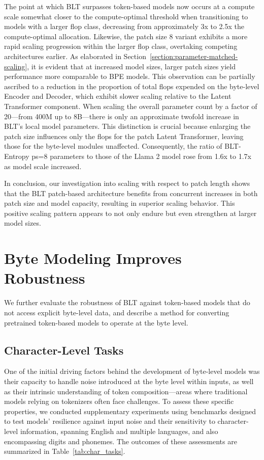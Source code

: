 The point at which {\textsc BLT} surpasses token-based models now occurs at a compute scale somewhat closer to the compute-optimal threshold when transitioning to models with a larger flop class, decreasing from approximately 3x to 2.5x the compute-optimal allocation. Likewise, the patch size 8 variant exhibits a more rapid scaling progression within the larger flop class, overtaking competing architectures earlier. As elaborated in Section~\ref{section:parameter-matched-scaling}, it is evident that at increased model sizes, larger patch sizes yield performance more comparable to BPE models. This observation can be partially ascribed to a reduction in the proportion of total flops expended on the byte-level Encoder and Decoder, which exhibit slower scaling relative to the Latent Transformer component. When scaling the overall parameter count by a factor of 20—from 400M up to 8B—there is only an approximate twofold increase in {\textsc BLT}'s local model parameters. This distinction is crucial because enlarging the patch size influences only the flops for the patch Latent Transformer, leaving those for the byte-level modules unaffected. Consequently, the ratio of {\textsc BLT}-Entropy ps=8 parameters to those of the Llama 2 model rose from 1.6x to 1.7x as model scale increased.

In conclusion, our investigation into scaling with respect to patch length shows that the {\textsc BLT} patch-based architecture benefits from concurrent increases in both patch size and model capacity, resulting in superior scaling behavior. This positive scaling pattern appears to not only endure but even strengthen at larger model sizes.

\section{Byte Modeling Improves Robustness} We further evaluate the robustness of {\textsc BLT} against token-based models that do not access explicit byte-level data, and describe a method for converting pretrained token-based models to operate at the byte level.
\label{sec:robustness}

\subsection{Character-Level Tasks}

One of the initial driving factors behind the development of byte-level models was their capacity to handle noise introduced at the byte level within inputs, as well as their intrinsic understanding of token composition—areas where traditional models relying on tokenizers often face challenges. To assess these specific properties, we conducted supplementary experiments using benchmarks designed to test models' resilience against input noise and their sensitivity to character-level information, spanning English and multiple languages, and also encompassing digits and phonemes. The outcomes of these assessments are summarized in Table~\ref{tab:char_tasks}.

